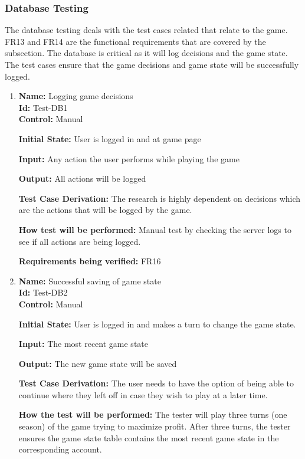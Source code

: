 \documentclass[12pt, titlepage]{article}
\begin{document}
\subsubsection{Database Testing}
The database testing deals with the test cases related that relate to the game. FR13 and FR14 are the functional requirements that are covered by the subsection. The database is critical as it will log decisions and the game state. The test cases ensure that the game decisions and game state will be successfully logged.
\begin{enumerate}

\item{\textbf{Name:} Logging game decisions\\} %
\textbf{Id:} Test-DB1    \label{Test-DB1}\\
\textbf{Control:} Manual
					
\textbf{Initial State:} User is logged in and at game page
					
\textbf{Input:} Any action the user performs while playing the game
					
\textbf{Output: }All actions will be logged

\textbf{Test Case Derivation:} The research is highly dependent on decisions which are the actions that will be logged by the game.

\textbf{How test will be performed:} Manual test by checking the server logs to see if all actions are being logged.

\textbf{Requirements being verified:} FR16

\item{\textbf{Name:} Successful saving of game state\\} %
\textbf{Id:} Test-DB2    \label{Test-DB2}\\
\textbf{Control:} Manual

\textbf{Initial State:} User is logged in and makes a turn to change the game state.

\textbf{Input:} The most recent game state

\textbf{Output:} The new game state will be saved

\textbf{Test Case Derivation:} The user needs to have the option of being able to continue where they left off in case they wish to play at a later time.

\textbf{How the test will be performed:} The tester will play three turns (one season) of the game trying to maximize profit. After three turns, the tester ensures the game state table contains the most recent game state in the corresponding account.


\end{enumerate}
\end{document}
